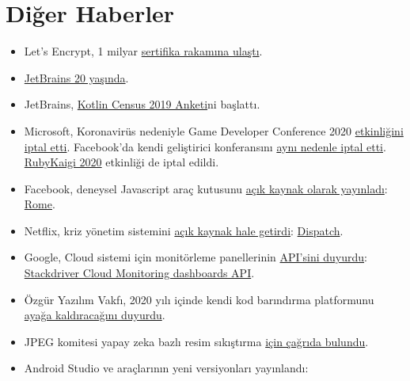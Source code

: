 \documentclass[11pt]{article}
\begin{document}
\section{Diğer Haberler}
\label{sec:orgf5f2b67}
\begin{itemize}
\item Let's Encrypt, 1 milyar \href{https://letsencrypt.org/2020/02/27/one-billion-certs.html}{sertifika rakamına ulaştı}.
\item \href{https://www.jetbrains.com/company/annualreport/2019/}{JetBrains 20 yaşında}.
\item JetBrains, \href{https://surveys.jetbrains.com/s3/e4-kotlin-census-2019}{Kotlin Census 2019 Anketi}ni başlattı.
\item Microsoft, Koronavirüs nedeniyle Game Developer Conference 2020 \href{https://www.gematsu.com/2020/02/microsoft-cancels-gdc-2020-presence-due-to-coronavirus-concerns}{etkinliğini
iptal etti}. Facebook'da kendi geliştirici konferansını \href{https://www.theguardian.com/technology/2020/feb/27/facebook-f8-coronavirus-san-francisco-health}{aynı nedenle iptal
etti}. \href{https://esa-pages.io/p/sharing/68/posts/1006/b15a58c675f5a69d06e5.html}{RubyKaigi 2020} etkinliği de iptal edildi.
\item Facebook, deneysel Javascript araç kutusunu \href{https://twitter.com/sebmck/status/1232885861135421441}{açık kaynak olarak yayınladı}:
\href{https://github.com/facebookexperimental/rome}{Rome}.
\item Netflix, kriz yönetim sistemini \href{https://medium.com/NetflixTechBlog/introducing-dispatch-da4b8a2a8072\%0A}{açık kaynak hale getirdi}: \href{https://github.com/Netflix/dispatch}{Dispatch}.
\item Google, Cloud sistemi için monitörleme panellerinin \href{https://cloud.google.com/blog/products/management-tools/introducing-the-cloud-monitoring-dashboards-api}{API'sini duyurdu}:
\href{https://cloud.google.com/monitoring/dashboards/api-dashboard}{Stackdriver Cloud Monitoring dashboards API}.
\item Özgür Yazılım Vakfı, 2020 yılı içinde kendi kod barındırma platformunu \href{https://www.fsf.org/blogs/sysadmin/coming-soon-a-new-site-for-fully-free-collaboration}{ayağa
kaldıracağını duyurdu}.
\item JPEG komitesi yapay zeka bazlı resim sıkıştırma \href{https://jpeg.org/items/20200217\_press.html}{için çağrıda bulundu}.
\item Android Studio ve araçlarının yeni versiyonları yayınlandı:
\begin{itemize}

\end{itemize}
\end{itemize}
\end{document}
